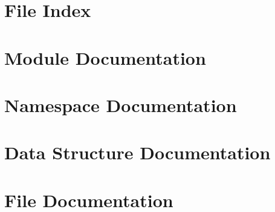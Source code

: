 \documentclass{book}
\begin{document}
\chapter{File Index}

\chapter{Module Documentation}






























\chapter{Namespace Documentation}

\chapter{Data Structure Documentation}









\chapter{File Documentation}




































\printindex
\end{document}
